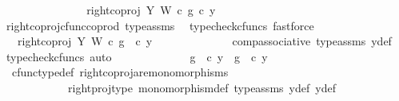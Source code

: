 \begin{isabellebody}
\ \ \ \ \ \ \ \ \ \ \isamarkupfalse%
\ \isamarkupfalse%
\ {\isachardoublequoteopen}{\isachardot}{\kern0pt}{\isachardot}{\kern0pt}{\isachardot}{\kern0pt}\ {\isacharequal}{\kern0pt}\ {\isacharparenleft}{\kern0pt}right{\isacharunderscore}{\kern0pt}coproj\ Y\ W\ {\isasymcirc}\isactrlsub c\ g{\isacharparenright}{\kern0pt}\ {\isasymcirc}\isactrlsub c\ y{}{\isachardoublequoteclose}\isanewline
\ \ \ \ \ \ \ \ \ \ \ \ \isamarkupfalse%
\ right{\isacharunderscore}{\kern0pt}coproj{\isacharunderscore}{\kern0pt}cfunc{\isacharunderscore}{\kern0pt}coprod\ type{\isacharunderscore}{\kern0pt}assms\ \isamarkupfalse%
\ {\isacharparenleft}{\kern0pt}typecheck{\isacharunderscore}{\kern0pt}cfuncs{\isacharcomma}{\kern0pt}\ fastforce{\isacharparenright}{\kern0pt}\isanewline
\ \ \ \ \ \ \ \ \ \ \isamarkupfalse%
\ \isamarkupfalse%
\ {\isachardoublequoteopen}{\isachardot}{\kern0pt}{\isachardot}{\kern0pt}{\isachardot}{\kern0pt}\ {\isacharequal}{\kern0pt}\ right{\isacharunderscore}{\kern0pt}coproj\ Y\ W\ {\isasymcirc}\isactrlsub c\ g\ \ {\isasymcirc}\isactrlsub c\ y{}{\isachardoublequoteclose}\isanewline
\ \ \ \ \ \ \ \ \ \ \ \ \isamarkupfalse%
\ comp{\isacharunderscore}{\kern0pt}associative{}\ type{\isacharunderscore}{\kern0pt}assms{\isacharparenleft}{\kern0pt}{}{\isacharparenright}{\kern0pt}\ y{}{\isacharunderscore}{\kern0pt}def\ \isamarkupfalse%
\ {\isacharparenleft}{\kern0pt}typecheck{\isacharunderscore}{\kern0pt}cfuncs{\isacharcomma}{\kern0pt}\ auto{\isacharparenright}{\kern0pt}\isanewline
\ \ \ \ \ \ \ \ \ \ \isamarkupfalse%
\ \isamarkupfalse%
\ {\isachardoublequoteopen}g\ \ {\isasymcirc}\isactrlsub c\ y{}\ {\isacharequal}{\kern0pt}\ g\ \ {\isasymcirc}\isactrlsub c\ y{}{\isachardoublequoteclose}\isanewline
\ \ \ \ \ \ \ \ \ \ \ \ \isamarkupfalse%
\ \ cfunc{\isacharunderscore}{\kern0pt}type{\isacharunderscore}{\kern0pt}def\ right{\isacharunderscore}{\kern0pt}coproj{\isacharunderscore}{\kern0pt}are{\isacharunderscore}{\kern0pt}monomorphisms\isanewline
\ \ \ \ \ \ \ \ \ \ \ \ right{\isacharunderscore}{\kern0pt}proj{\isacharunderscore}{\kern0pt}type\ monomorphism{\isacharunderscore}{\kern0pt}def\ type{\isacharunderscore}{\kern0pt}assms{\isacharparenleft}{\kern0pt}{}{\isacharparenright}{\kern0pt}\ y{}{\isacharunderscore}{\kern0pt}def\ y{}{\isacharunderscore}{\kern0pt}def\ \isamarkupfalse%

\end{isabellebody}
